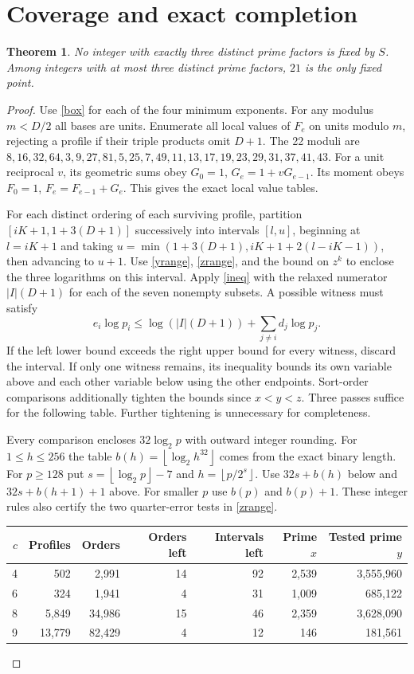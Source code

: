 \documentclass[11pt]{article}
\newtheorem{theorem}{Theorem}
\newcommand{\fl}[1]{\left\lfloor #1\right\rfloor}
\begin{document}
\section{Coverage and exact completion}
\begin{theorem}No integer with exactly three distinct prime factors is fixed by $S$. Among integers with at most three distinct prime factors, $21$ is the only fixed point.\end{theorem}
\begin{proof}
Use \eqref{box} for each of the four minimum exponents. For any modulus $m<D/2$ all bases are units. Enumerate all local values of $F_e$ on units modulo $m$, rejecting a profile if their triple products omit $D+1$. The 22 moduli are $8,16,32,64,3,9,27,81,5,25,7,49,11,13,17,19,23,29,31,37,41,43$. For a unit reciprocal $v$, its geometric sums obey $G_0=1$, $G_e=1+vG_{e-1}$. Its moment obeys $F_0=1$, $F_e=F_{e-1}+G_e$. This gives the exact local value tables.

For each distinct ordering of each surviving profile, partition $[iK+1,1+3(D+1)]$ successively into intervals $[l,u]$, beginning at $l=iK+1$ and taking $u=\min(1+3(D+1),iK+1+2(l-iK-1))$, then advancing to $u+1$. Use \eqref{yrange}, \eqref{zrange}, and the bound on $z^k$ to enclose the three logarithms on this interval. Apply \eqref{ineq} with the relaxed numerator $|I|(D+1)$ for each of the seven nonempty subsets. A possible witness must satisfy
\[
 e_i\log p_i\le \log(|I|(D+1))+\sum_{j\ne i}d_j\log p_j.
\]
If the left lower bound exceeds the right upper bound for every witness, discard the interval. If only one witness remains, its inequality bounds its own variable above and each other variable below using the other endpoints. Sort-order comparisons additionally tighten the bounds since $x<y<z$. Three passes suffice for the following table. Further tightening is unnecessary for completeness.

Every comparison encloses $32\log_2 p$ with outward integer rounding. For $1\le h\le256$ the table $b(h)=\fl{\log_2 h^{32}}$ comes from the exact binary length. For $p\ge128$ put $s=\fl{\log_2 p}-7$ and $h=\fl{p/2^s}$. Use $32s+b(h)$ below and $32s+b(h+1)+1$ above. For smaller $p$ use $b(p)$ and $b(p)+1$. These integer rules also certify the two quarter-error tests in \eqref{zrange}.

\begin{center}\small
\begin{tabular}{rrrrrrr}\toprule
$c$ & Profiles & Orders & Orders left & Intervals left & Prime $x$ & Tested prime $y$\\\midrule
4&502&2,991&14&92&2,539&3,555,960\\
6&324&1,941&4&31&1,009&685,122\\
8&5,849&34,986&15&46&2,359&3,628,090\\
9&13,779&82,429&4&12&146&181,561\\\bottomrule\end{tabular}
\end{center}


\end{proof}
\end{document}
